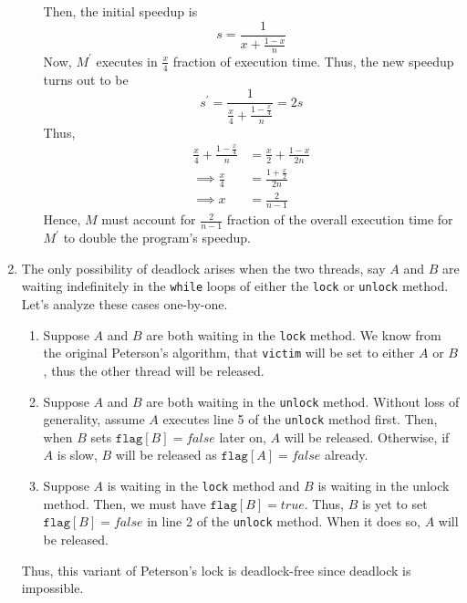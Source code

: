 \documentclass[conference,compsoc]{IEEEtran}
\begin{document}
\begin{enumerate}
\begin{enumerate}
        Then, the initial speedup is
        \begin{equation}
            s = \frac{1}{x + \frac{1 - x}{n}}
        \end{equation}
        Now, \(M^\prime\) executes in \(\frac{x}{4}\) fraction of execution
        time. Thus, the new speedup turns out to be
        \begin{equation}
            s^\prime = \frac{1}{\frac{x}{4} + \frac{1 - \frac{x}{4}}{n}} = 2s
        \end{equation}
        Thus,
        \begin{align}
            \frac{x}{4} + \frac{1 - \frac{x}{4}}{n} &= \frac{x}{2} + \frac{1 - x}{2n} \\
            \implies \frac{x}{4} &= \frac{1 + \frac{x}{2}}{2n} \\
            \implies x &= \frac{2}{n - 1}
        \end{align}
        Hence, \(M\) must account for \(\frac{2}{n - 1}\) fraction of the
        overall execution time for \(M^\prime\) to double the program's speedup.
    \end{enumerate}

    \item The only possibility of deadlock arises when the two threads, say
    \(A\) and \(B\) are waiting indefinitely in the \texttt{while} loops of
    either the \texttt{lock} or \texttt{unlock} method. Let's analyze these
    cases one-by-one.
    \begin{enumerate}
        \item Suppose \(A\) and \(B\) are both waiting in the \texttt{lock}
        method. We know from the original Peterson's algorithm, that
        \texttt{victim} will be set to either \(A\) or \(B\), thus the other
        thread will be released.
        \item Suppose \(A\) and \(B\) are both waiting in the \texttt{unlock}
        method. Without loss of generality, assume \(A\) executes line 5 of the
        \texttt{unlock} method first. Then, when \(B\) sets \(\texttt{flag}[B] =
        false\) later on, \(A\) will be released. Otherwise, if \(A\) is slow,
        \(B\) will be released as \(\texttt{flag}[A] = false\) already.
        \item Suppose \(A\) is waiting in the \texttt{lock} method and \(B\) is
        waiting in the unlock method. Then, we must have \(\texttt{flag}[B] =
        true\). Thus, \(B\) is yet to set \(\texttt{flag}[B] = false\) in line 2
        of the \texttt{unlock} method. When it does so, \(A\) will be released.
    \end{enumerate}
    Thus, this variant of Peterson's lock is deadlock-free since deadlock is
    impossible.


\end{enumerate}
\end{document}
